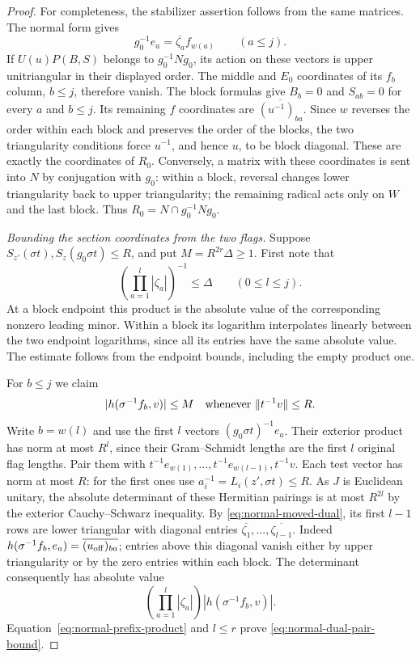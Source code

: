 \begin{proof}
For completeness, the stabilizer assertion follows from the
same matrices.  The normal form gives
\begin{equation}\label{eq:normal-moved-dual}
                     g_0^{-1}e_a=\overline{\zeta_a}f_{w(a)}
                             \qquad(a\le j).
\end{equation}
If $U(u)P(B,S)$ belongs to $g_0^{-1}Ng_0$, its action on
these vectors is upper unitriangular in their displayed order.
The middle and $E_0$ coordinates of its $f_b$ column, $b\le j$,
therefore vanish.  The block formulas give $B_b=0$ and
$S_{ab}=0$ for every $a$ and $b\le j$.  Its remaining
$f$ coordinates are $\overline{(u^{-1})_{ba}}$.  Since $w$
reverses the order within each block and preserves the order
of the blocks, the two triangularity conditions force
$u^{-1}$, and hence $u$, to be block diagonal.  These are
exactly the coordinates of $R_0$.  Conversely, a matrix with
these coordinates is sent into $N$ by conjugation with $g_0$:
within a block, reversal changes lower triangularity back to
upper triangularity; the remaining radical acts only on
$W$ and the last block.  Thus $R_0=N\cap g_0^{-1}Ng_0$.

\emph{Bounding the section coordinates from the two flags.}
Suppose $S_{z'}(\sigma t),S_z(g_0\sigma t)\le R$, and put
$M=R^{2r}\Delta\ge1$.  First note that
\begin{equation}\label{eq:normal-prefix-product}
                       \left(\prod_{a=1}^{l}|\zeta_a|\right)^{-1}
                              \le\Delta\qquad(0\le l\le j).
\end{equation}
At a block endpoint this product is the absolute value of the
corresponding nonzero leading minor.  Within a block its
logarithm interpolates linearly between the two endpoint
logarithms, since all its entries have the same absolute value.
The estimate follows from the endpoint bounds, including the
empty product one.

For $b\le j$ we claim
\begin{equation}\label{eq:normal-dual-pair-bound}
     |h(\sigma^{-1}f_b,v)|\le M
            \quad\hbox{whenever }\|t^{-1}v\|\le R.
\end{equation}
Write $b=w(l)$ and use the first $l$ vectors
$(g_0\sigma t)^{-1}e_a$.  Their exterior product has norm at
most $R^l$, since their Gram--Schmidt lengths are the first
$l$ original flag lengths.  Pair them with
$t^{-1}e_{w(1)},\ldots,t^{-1}e_{w(l-1)},t^{-1}v$.
Each test vector has norm at most $R$: for the first ones use
$a_i^{-1}=L_i(z',\sigma t)\le R$.  As $J$ is Euclidean
unitary, the absolute determinant of these Hermitian pairings
is at most $R^{2l}$ by the exterior Cauchy--Schwarz inequality.
By \eqref{eq:normal-moved-dual}, its first $l-1$ rows are
lower triangular with diagonal entries
$\overline{\zeta_1},\ldots,\overline{\zeta_{l-1}}$.
Indeed
$h(\sigma^{-1}f_b,e_a)=\overline{(u_{\rm off})_{ba}}$;
entries above this diagonal vanish either by upper
triangularity or by the zero entries within each block.
The determinant consequently has absolute value
\[
       \left(\prod_{a=1}^l|\zeta_a|\right)
                           |h(\sigma^{-1}f_b,v)|.
\]
Equation~\eqref{eq:normal-prefix-product} and $l\le r$ prove
\eqref{eq:normal-dual-pair-bound}.


\end{proof}
